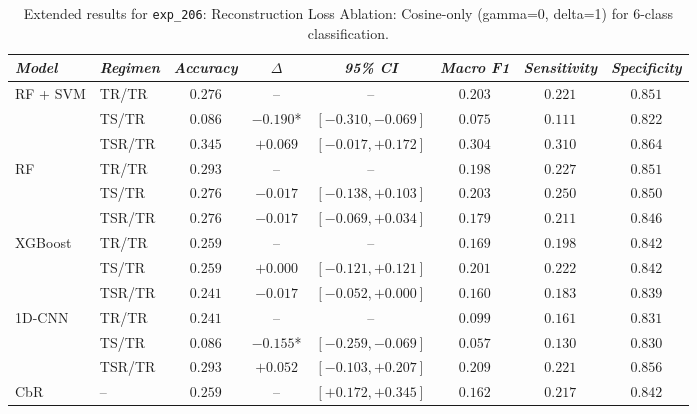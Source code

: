 \begin{table}[H]
\centering
\scriptsize
\caption{Extended results for \texttt{exp\_206}: Reconstruction Loss Ablation: Cosine-only (gamma=0, delta=1) for 6-class classification.}
\label{tab:appendix_exp_206}
\begin{tabular*}{\textwidth}{@{\extracolsep{\fill}}llcccccc}
\toprule
\emph{Model} & \emph{Regimen} & \emph{Accuracy} & \emph{$\Delta$} & \emph{95\% CI} & \emph{Macro F1} & \emph{Sensitivity} & \emph{Specificity}\\
\midrule
\multirow{3}{*}{RF + SVM} & TR/TR & $0.276$ & -- & -- & $0.203$ & $0.221$ & $0.851$\\
 & TS/TR & $0.086$ & $-0.190$* & $[-0.310, -0.069]$ & $0.075$ & $0.111$ & $0.822$\\
 & TSR/TR & $0.345$ & $+0.069$ & $[-0.017, +0.172]$ & $0.304$ & $0.310$ & $0.864$\\
\midrule
\multirow{3}{*}{RF} & TR/TR & $0.293$ & -- & -- & $0.198$ & $0.227$ & $0.851$\\
 & TS/TR & $0.276$ & $-0.017$ & $[-0.138, +0.103]$ & $0.203$ & $0.250$ & $0.850$\\
 & TSR/TR & $0.276$ & $-0.017$ & $[-0.069, +0.034]$ & $0.179$ & $0.211$ & $0.846$\\
\midrule
\multirow{3}{*}{XGBoost} & TR/TR & $0.259$ & -- & -- & $0.169$ & $0.198$ & $0.842$\\
 & TS/TR & $0.259$ & $+0.000$ & $[-0.121, +0.121]$ & $0.201$ & $0.222$ & $0.842$\\
 & TSR/TR & $0.241$ & $-0.017$ & $[-0.052, +0.000]$ & $0.160$ & $0.183$ & $0.839$\\
\midrule
\multirow{3}{*}{1D-CNN} & TR/TR & $0.241$ & -- & -- & $0.099$ & $0.161$ & $0.831$\\
 & TS/TR & $0.086$ & $-0.155$* & $[-0.259, -0.069]$ & $0.057$ & $0.130$ & $0.830$\\
 & TSR/TR & $0.293$ & $+0.052$ & $[-0.103, +0.207]$ & $0.209$ & $0.221$ & $0.856$\\
\midrule
CbR & -- & $0.259$ & -- & $[+0.172, +0.345]$ & $0.162$ & $0.217$ & $0.842$\\
\bottomrule
\end{tabular*}
\end{table}

